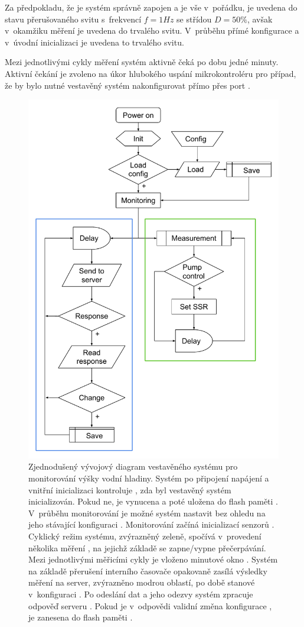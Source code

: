         Za předpokladu, že je systém správně zapojen a je vše v~pořádku, je uvedena  do stavu přerušovaného svitu s~frekvencí $f=1\unit{Hz}$ se střídou $D=50\unit{\%}$, avšak v~okamžiku měření je uvedena do trvalého svitu. 
        V~průběhu přímé konfigurace a v~úvodní inicializaci je  uvedena to trvalého svitu.

        Mezi jednotlivými cykly měření systém aktivně čeká po dobu jedné minuty. Aktivní čekání je zvoleno na úkor hlubokého uspání mikrokontroléru pro případ, že by bylo nutné vestavěný systém nakonfigurovat přímo přes port .

        \begin{figure}[h]
            \centering
            \includegraphics[width=0.7\linewidth]{obrazky-figures/diagram.pdf}
            \caption{Zjednodušený vývojový diagram vestavěného systému pro monitorování výšky vodní hladiny. Systém po připojení napájení  a vnitřní inicializaci  kontroluje , zda byl vestavěný systém inicializován. Pokud ne, je vynucena  a poté uložena do flash paměti . V~průběhu monitorování je možné systém nastavit bez ohledu na jeho stávající konfiguraci . Monitorování začíná inicializací senzorů . 
            Cyklický režim systému, zvýrazněný zeleně, spočívá v~provedení několika měření , na jejichž základě  se zapne/vypne  přečerpávání. Mezi jednotlivými měřicími cykly je vloženo minutové okno . 
            Systém na základě přerušení interního časovače opakovaně zasílá výsledky měření na server, zvýrazněno modrou oblastí, po době stanové v~konfiguraci . Po odeslání dat  a jeho odezvy  systém zpracuje odpověď serveru . Pokud je v~odpovědi validní změna konfigurace , je zanesena do flash paměti .}
            \label{img:diagram}
        \end{figure}


